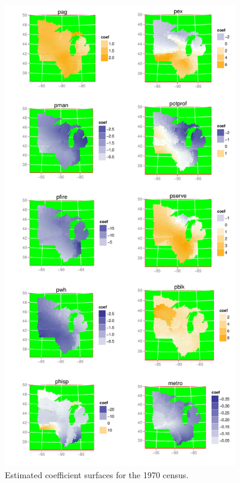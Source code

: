 \documentclass[authoryear, review, 11pt]{elsarticle}
\begin{document}
	\begin{figure}
		\begin{center}
			\includegraphics[height=8in]{../../figures/poverty/1970.linear.coefficients.pdf}
			\caption{Estimated coefficient surfaces for the 1970 census.\label{fig:1970}}
		\end{center}
	\end{figure}
	
\end{document}
